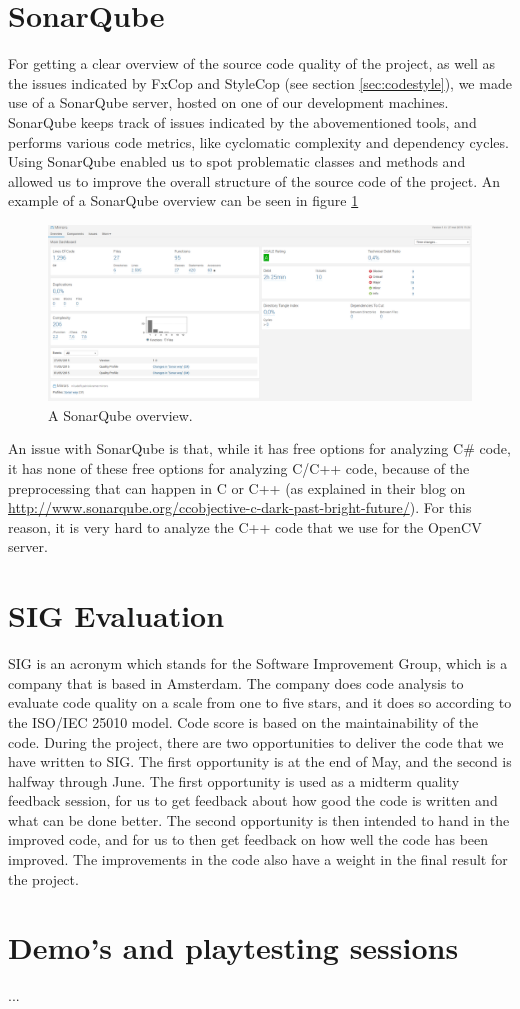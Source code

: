 	\section{SonarQube} \label{sec:sonarqube}
		For getting a clear overview of the source code quality of the project, as 
		well as the issues indicated by FxCop and StyleCop (see section 
		\ref{sec:codestyle}), we made use of a SonarQube server, hosted on one of 
		our development machines. SonarQube keeps track of issues indicated by 
		the abovementioned tools, and performs various code metrics, like cyclomatic 
		complexity and dependency cycles. Using SonarQube enabled us to spot 
		problematic classes and methods and allowed us to improve the overall 
		structure of the source code of the project. An example of a SonarQube
		overview can be seen in figure \ref{fig:sonarqube}
		
		\begin{figure}[!ht]
			\centering
			\includegraphics[width=\textwidth]{SonarQube}
			\caption{A SonarQube overview.}
			\label{fig:sonarqube}
		\end{figure}
		
		An issue with SonarQube is that, while it has free options for analyzing
		C\# code, it has none of these free options for analyzing C/C++ code,
		because of the preprocessing that can happen in C or C++ (as explained
		in their blog on \url{http://www.sonarqube.org/ccobjective-c-dark-past-bright-future/}).
		For this reason, it is very hard to analyze the C++ code that we use for the
		OpenCV server.
		
	\section{SIG Evaluation} \label{sec:sigevaluation}
		SIG is an acronym which stands for the Software Improvement Group,
		which is a company that is based in Amsterdam. The company does code
		analysis to evaluate code quality on a scale from one to five stars,
		and it does so according to the ISO/IEC 25010 model. Code score is 
		based on the maintainability of the code. During the project, there 
		are two opportunities to deliver the code that we have written to
		SIG. The first opportunity is at the end of May, and the second is
		halfway through June. The first opportunity is used as a midterm
		quality feedback session, for us to get feedback about how good
		the code is written and what can be done better. The second opportunity
		is then intended to hand in the improved code, and for us to then
		get feedback on how well the code has been improved. The improvements
		in the code also have a weight in the final result for the project.
		
	\section{Demo's and playtesting sessions} \label{sec:demos}
		...
